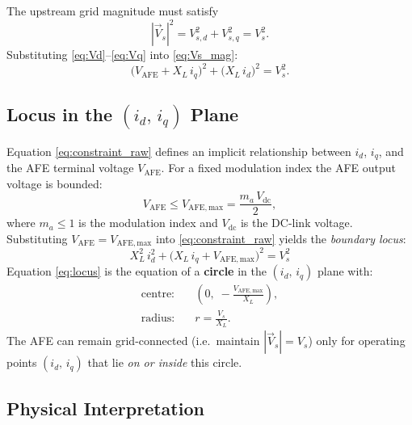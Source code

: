 \documentclass[a4paper,11pt]{article}
\begin{document}
The upstream grid magnitude must satisfy
%
\begin{equation}
	|\overrightarrow{V}_s|^2 = V_{s,d}^2 + V_{s,q}^2 = V_s^2.
	\label{eq:Vs_mag}
\end{equation}
%
Substituting \eqref{eq:Vd}--\eqref{eq:Vq} into \eqref{eq:Vs_mag}:
%
\begin{equation}
	\bigl(V_\mathrm{AFE} + X_L\,i_q\bigr)^2
	+ \bigl(X_L\,i_d\bigr)^2
	= V_s^2.
	\label{eq:constraint_raw}
\end{equation}

\subsection{Locus in the \texorpdfstring{$(i_d,\,i_q)$}{(id, iq)} Plane}

Equation \eqref{eq:constraint_raw} defines an implicit relationship
between $i_d$, $i_q$, and the AFE terminal voltage $V_\mathrm{AFE}$.
For a fixed modulation index the AFE output voltage is bounded:
%
\begin{equation}
	V_\mathrm{AFE} \leq V_\mathrm{AFE,max}
	= \frac{m_a\,V_\mathrm{dc}}{2},
	\label{eq:Vmax}
\end{equation}
%
where $m_a \leq 1$ is the modulation index and $V_\mathrm{dc}$ is the
DC-link voltage.  Substituting $V_\mathrm{AFE} = V_\mathrm{AFE,max}$
into \eqref{eq:constraint_raw} yields the \emph{boundary locus}:
%
\begin{equation}
	\boxed{
		X_L^2\,i_d^2
		+ \bigl(X_L\,i_q + V_\mathrm{AFE,max}\bigr)^2
		= V_s^2
	}
	\label{eq:locus}
\end{equation}
%
Equation \eqref{eq:locus} is the equation of a \textbf{circle} in the
$(i_d,\,i_q)$ plane with:
%
\begin{align}
	\text{centre:} \quad
	& \left(0,\;-\frac{V_\mathrm{AFE,max}}{X_L}\right),
	\label{eq:centre}\\
	\text{radius:} \quad
	& r = \frac{V_s}{X_L}.
	\label{eq:radius}
\end{align}
%
The AFE can remain grid-connected (i.e.\ maintain $|\overrightarrow{V}_s|
= V_s$) only for operating points $(i_d,\,i_q)$ that lie \emph{on or
	inside} this circle.

\subsection{Physical Interpretation}
\end{document}
